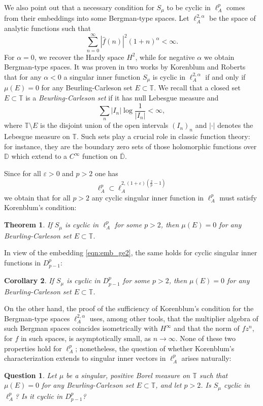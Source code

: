 \documentclass{birkjour}
\numberwithin{equation}{section}
\theoremstyle{plain}
\newtheorem{theo}{Theorem}[section]
\newtheorem{coro}[theo]{Corollary}
\newtheorem{question}{Question}
\theoremstyle{definition}
\newcommand{\T}{\mathbb{T}}
\newcommand{\D}{\mathbb{D}}
\newcommand{\1}{\mathds{1}}
\begin{document}
We also point out that a necessary condition for $S_\mu$ to be cyclic in $\ell^p_A$ comes from their embeddings into some Bergman-type spaces. Let $\ell^{2, \alpha}_A$ be the space of analytic functions such that 
\begin{equation}
\label{eqn:ell2alpha}
\sum_{n=0}^\infty|\hat{f}(n)|^2(1+n)^{\alpha}<\infty.
\end{equation}
For $\alpha=0$, we recover the Hardy space $H^2$, while for negative $\alpha$ we obtain Bergman-type spaces. It was proven in two works by Korenblum \cite{korenblum81} and Roberts \cite{Roberts85} that for any $\alpha<0$ a singular inner function $S_\mu$ is cyclic in $\ell^{2, \alpha}_A$ if and only if $\mu(E)=0$ for any Beurling-Carleson set $E\subset\T$. We recall that a closed set $E\subset\T$ is a \emph{Beurling-Carleson set} if it has null Lebesgue measure and 
\begin{equation}
\label{eqn:bc}
\sum_n|I_n|\log\frac{1}{|I_n|}<\infty,
\end{equation}
where $\T\setminus E$ is the disjoint union of the open intervals $(I_n)_n$ and $|\cdot|$ denotes the Lebesgue measure on $\T$. Such sets play a crucial role in classic function theory: for instance, they are the boundary zero sets of those holomorphic functions over $\D$ which extend to a $C^\infty$ function on $\overline{\D}$. 

Since for all $\varepsilon>0$ and $p>2$ one has
\[
\ell^p_A\subset\ell^{2, (1+\varepsilon)\left(\frac{2}{p}-1\right)}_A
\]
we obtain that for all $p>2$ any cyclic singular inner function in $\ell^p_A$ must satisfy Korenblum's condition:
\begin{theo}
\label{theo:necessity}
 If $S_\mu$ is cyclic in $\ell^p_A$ for some $p>2$, then $\mu(E)=0$ for any Beurling-Carleson set $E\subset\T$.
\end{theo}
In view of the embedding \eqref{eqn:emb_ge2}, the same holds for cyclic singular inner functions in $D^p_{p-1}$:
\begin{coro}
If $S_\mu$ is cyclic in $D^p_{p-1}$ for some $p>2$, then $\mu(E)=0$ for any Beurling-Carleson set $E\subset\T$.
\end{coro}
On the other hand, the proof of the sufficiency of Korenblum's condition for the Bergman-type spaces $\ell^{2,\alpha}_A$ uses, among other tools, that the multiplier algebra of such Bergman spaces coincides isometrically with $H^\infty$ and that the norm of $f z^n$, for $f$ in such spaces, is asymptotically small, as $n\to\infty$. None of these two properties hold for $\ell^p_A$; nonetheless, the question of whether Korenblum's characterization extends to singular inner vectors in $\ell^p_A$ arises naturally:
\begin{question}
Let $\mu$ be a singular, positive Borel measure on $\T$ such that $\mu(E)=0$ for any Beurling-Carleson set $E\subset\T$, and let $p>2$. Is $S_\mu$ cyclic in $\ell^p_A$? Is it cyclic in $D^p_{p-1}$?
\end{question}
\end{document}
